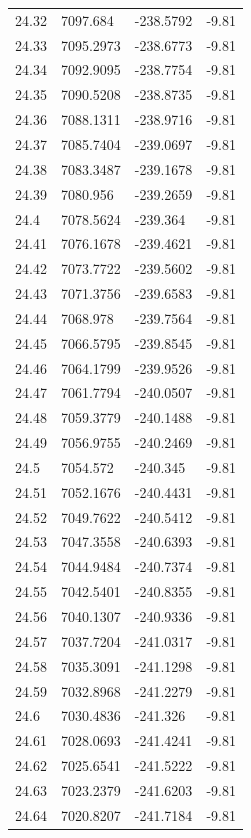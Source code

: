 \begin{table}[H]
\begin{tabular}{llll}
24.32 & 7097.684 & -238.5792 & -9.81 \\
24.33 & 7095.2973 & -238.6773 & -9.81 \\
24.34 & 7092.9095 & -238.7754 & -9.81 \\
24.35 & 7090.5208 & -238.8735 & -9.81 \\
24.36 & 7088.1311 & -238.9716 & -9.81 \\
24.37 & 7085.7404 & -239.0697 & -9.81 \\
24.38 & 7083.3487 & -239.1678 & -9.81 \\
24.39 & 7080.956 & -239.2659 & -9.81 \\
24.4 & 7078.5624 & -239.364 & -9.81 \\
24.41 & 7076.1678 & -239.4621 & -9.81 \\
24.42 & 7073.7722 & -239.5602 & -9.81 \\
24.43 & 7071.3756 & -239.6583 & -9.81 \\
24.44 & 7068.978 & -239.7564 & -9.81 \\
24.45 & 7066.5795 & -239.8545 & -9.81 \\
24.46 & 7064.1799 & -239.9526 & -9.81 \\
24.47 & 7061.7794 & -240.0507 & -9.81 \\
24.48 & 7059.3779 & -240.1488 & -9.81 \\
24.49 & 7056.9755 & -240.2469 & -9.81 \\
24.5 & 7054.572 & -240.345 & -9.81 \\
24.51 & 7052.1676 & -240.4431 & -9.81 \\
24.52 & 7049.7622 & -240.5412 & -9.81 \\
24.53 & 7047.3558 & -240.6393 & -9.81 \\
24.54 & 7044.9484 & -240.7374 & -9.81 \\
24.55 & 7042.5401 & -240.8355 & -9.81 \\
24.56 & 7040.1307 & -240.9336 & -9.81 \\
24.57 & 7037.7204 & -241.0317 & -9.81 \\
24.58 & 7035.3091 & -241.1298 & -9.81 \\
24.59 & 7032.8968 & -241.2279 & -9.81 \\
24.6 & 7030.4836 & -241.326 & -9.81 \\
24.61 & 7028.0693 & -241.4241 & -9.81 \\
24.62 & 7025.6541 & -241.5222 & -9.81 \\
24.63 & 7023.2379 & -241.6203 & -9.81 \\
24.64 & 7020.8207 & -241.7184 & -9.81 \\

\end{tabular}
\end{table}
